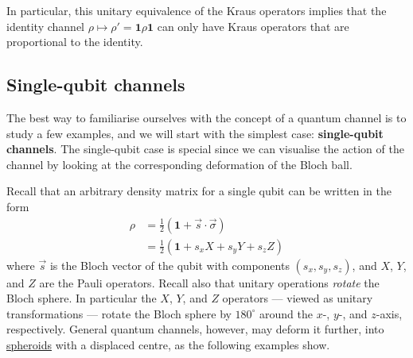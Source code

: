 \documentclass[fleqn]{article}
\begin{document}
In particular, this unitary equivalence of the Kraus operators implies that the identity channel \(\rho\mapsto\rho'=\mathbf{1}\rho\mathbf{1}\) can only have Kraus operators that are proportional to the identity.

\hypertarget{single-qubit-channels}{%
\subsection{Single-qubit channels}\label{single-qubit-channels}}

The best way to familiarise ourselves with the concept of a quantum channel is to study a few examples, and we will start with the simplest case: \textbf{single-qubit channels}.
The single-qubit case is special since we can visualise the action of the channel by looking at the corresponding deformation of the Bloch ball.

Recall that an arbitrary density matrix for a single qubit can be written in the form
\[
  \begin{aligned}
    \rho
    &= \frac{1}{2}\left(\mathbf{1}+\vec{s}\cdot \vec\sigma\right)
  \\&= \frac{1}{2}\left(\mathbf{1}+s_x X+ s_y Y + s_z Z\right)
  \end{aligned}
\]
where \(\vec{s}\) is the Bloch vector of the qubit with components \((s_x, s_y, s_z)\), and \(X\), \(Y\), and \(Z\) are the Pauli operators.
Recall also that unitary operations \emph{rotate} the Bloch sphere.
In particular the \(X\), \(Y\), and \(Z\) operators --- viewed as unitary transformations --- rotate the Bloch sphere by \(180^\circ\) around the \(x\)-, \(y\)-, and \(z\)-axis, respectively.
General quantum channels, however, may deform it further, into \href{https://en.wikipedia.org/wiki/Spheroid}{spheroids} with a displaced centre, as the following examples show.
\end{document}
